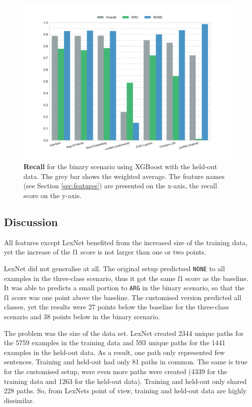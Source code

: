     \begin{figure}[htbp]
              \caption{\textbf{Recall} for the binary scenario using XGBoost with the held-out data. The grey bar shows the weighted average. The feature names (see Section \ref{sec:features}) are presented on the x-axis, the recall score on the y-axis.} 
       \label{fig:h_2_rec}
 \centering
	\includegraphics[width=0.9\linewidth]{images/heldout/h-recall-True}

\end{figure}
\FloatBarrier
\subsection{Discussion}
All features except LexNet benefited from the increased size of the training data, yet the increase of the f1 score is not larger than one or two points.\newline

LexNet did not generalise at all. The original setup predictsed \texttt{NONE} to all examples in the three-class scenario, thus it got the same f1 score as the baseline. It was able to predicts a small portion to \texttt{ARG} in the binary scenario, so that the f1 score was one point above the baseline. The customised version predicted all classes, yet the results were 27 points below the baseline for the three-class scenario and 38 points below in the binary scenario.

The problem was the size of the data set. LexNet created 2344 unique paths for the 5759 examples in the training data and 593 unique paths for the 1441 examples in the held-out data. As a result, one path only represented few sentences. Training and held-out had only 81 paths in common. The same is true for the customised setup, were even more paths were created (4339 for the training data and 1263 for the held-out data). Training and held-out only shared 228 paths. So, from LexNets point of view, training and held-out data are highly dissimilar.

